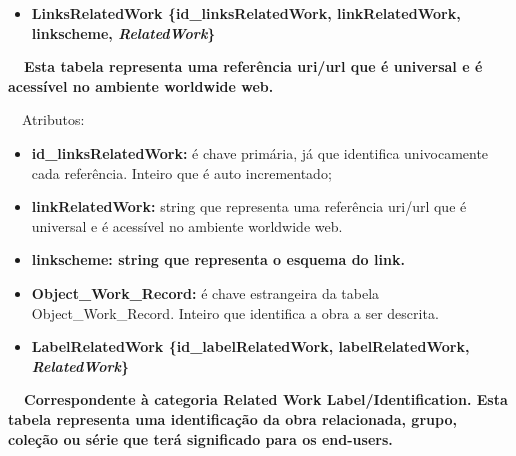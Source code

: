 \documentclass[letterpaper]{article}
\newcommand\textstyleStrongEmphasis[1]{\textbf{#1}}
\newcommand\liststyleLi{%
\renewcommand\labelitemi{{\textbullet}}
\renewcommand\labelitemii{[27A2?]}
\renewcommand\labelitemiii{{\textbullet}}
\renewcommand\labelitemiv{{\textbullet}}
}
\newcommand\liststyleLvi{%
\renewcommand\labelitemi{[27A2?]}
\renewcommand\labelitemii{[27A2?]}
\renewcommand\labelitemiii{[27A2?]}
\renewcommand\labelitemiv{[27A2?]}
}
\begin{document}
\bigskip

\liststyleLi
\begin{itemize}
\item {\bfseries
LinksRelatedWork\textmd{ \{}\textmd{id\_linksRelatedWork}\textmd{,
linkRelatedWork, linkscheme, }\textmd{\textit{RelatedWork}}\textmd{\}}}
\end{itemize}
{\bfseries
\foreignlanguage{english}{\textmd{\ \ Esta
}}\textstyleStrongEmphasis{\foreignlanguage{english}{\textmd{tabela}}}\foreignlanguage{english}{\textmd{
representa uma refer\^encia uri/url que \'e universal e \'e acess\'ivel
no ambiente worldwide web.}}}


\bigskip

{
\ \ Atributos:}

\liststyleLvi
\begin{itemize}
\item {
\textbf{id\_}\textbf{linksRelatedWork}\textbf{:} \'e chave prim\'aria,
j\'a que identifica univocamente cada refer\^encia. Inteiro que \'e
auto incrementado;}
\item {
\textbf{linkRelatedWork:} string que representa uma refer\^encia uri/url
que \'e universal e \'e acess\'ivel no ambiente worldwide web.}
\item {\bfseries
linkscheme:\textmd{ string que representa o esquema do link.}}
\item {
\textbf{Object\_Work\_Record:}\textit{ }\'e chave estrangeira da tabela
Object\_Work\_Record. Inteiro que identifica a obra a ser descrita.}
\end{itemize}

\bigskip

\liststyleLi
\begin{itemize}
\item {\bfseries
LabelRelatedWork\textmd{ \{}\textmd{id\_labelRelatedWork}\textmd{,
labelRelatedWork, }\textmd{\textit{RelatedWork}}\textmd{\}}}
\end{itemize}
{\bfseries
\foreignlanguage{english}{\textmd{\ \ Correspondente \`a categoria
}}\textstyleStrongEmphasis{\foreignlanguage{english}{Related Work
Label/Identification}}\textstyleStrongEmphasis{\foreignlanguage{english}{\textmd{.
}}}\foreignlanguage{english}{\textmd{Esta
}}\textstyleStrongEmphasis{\foreignlanguage{english}{\textmd{tabela}}}\foreignlanguage{english}{\textmd{
representa uma identifica\c{c}\~ao da obra relacionada, grupo,
cole\c{c}\~ao ou s\'erie que ter\'a significado para os end-users.}}}
\end{document}
